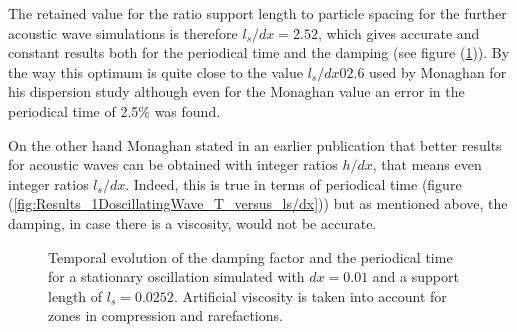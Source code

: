 \documentclass[11pt,a4paper,twoside]{report}
\begin{document}
The retained value for the ratio support length to particle spacing for the further acoustic wave simulations is therefore $l_s/dx=2.52$, which gives accurate and constant results both for the periodical time and the damping (see figure (\ref{fig:Results_1DoscillatingWave_supLen0252})). By the way this optimum is quite close to the value $l_s/dx02.6$ used by Monaghan for his dispersion study \cite{Monaghan2005} although even for the Monaghan value an error in the periodical time of 2.5\% was found. 

On the other hand Monaghan stated in an earlier publication \cite{Monaghan1992} that better results for acoustic waves can be obtained with integer ratios $h/dx$, that means even integer ratios $l_s/dx$. Indeed, this is true in terms of periodical time (figure (\ref{fig:Results_1DoscillatingWave_T_versus_ls/dx})) but as mentioned above, the damping, in case there is a viscosity, would not be accurate.

\begin{figure}[h]
 \label{fig:Results_1DoscillatingWave_supLen0252}
\centering
{}
\caption[1D Oscillation: Damping factor and periodical time for $l_s/dx=2.52$]{Temporal evolution of the damping factor and the periodical time for a stationary oscillation simulated with $dx=0.01$ and a support length of $l_s=0.0252$. Artificial viscosity is taken into account for zones in compression and rarefactions.}

\end{figure}
\end{document}
